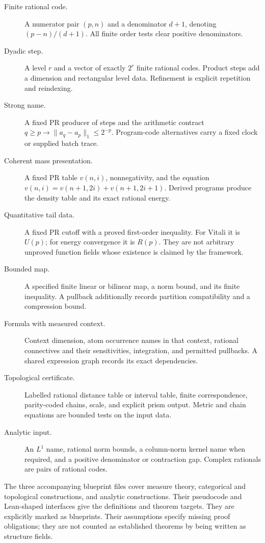 \begin{description}
\item[Finite rational code.] A numerator pair \((p,n)\) and a
denominator \(d+1\), denoting \((p-n)/(d+1)\). All finite order
tests clear positive denominators.
\item[Dyadic step.] A level \(r\) and a vector of exactly \(2^r\)
finite rational codes. Product steps add a dimension and rectangular
level data. Refinement is explicit repetition and reindexing.
\item[Strong name.] A fixed PR producer of steps and the arithmetic
contract \(q\geq p\to\|a_q-a_p\|_1\leq2^{-p}\).
Program-code alternatives carry a fixed clock or supplied batch trace.
\item[Coherent mass presentation.] A fixed PR table
\(v(n,i)\), nonnegativity, and the equation
\(v(n,i)=v(n+1,2i)+v(n+1,2i+1)\). Derived programs produce the
density table and its exact rational energy.
\item[Quantitative tail data.] A fixed PR cutoff with a proved
first-order inequality. For Vitali it is \(U(p)\); for energy
convergence it is \(R(p)\). They are not arbitrary unproved function
fields whose existence is claimed by the framework.
\item[Bounded map.] A specified finite linear or bilinear map, a
norm bound, and its finite inequality. A pullback additionally records
partition compatibility and a compression bound.
\item[Formula with measured context.] Context dimension, atom
occurrence names in that context, rational connectives and their
sensitivities, integration, and permitted pullbacks. A shared
expression graph records its exact dependencies.
\item[Topological certificate.] Labelled rational distance table or
interval table, finite correspondence, parity-coded chains, scale,
and explicit prism output. Metric and chain equations are bounded
tests on the input data.
\item[Analytic input.] An \(L^1\) name, rational norm bounds, a
column-norm kernel name when required, and a positive denominator or
contraction gap. Complex rationals are pairs of rational codes.
\end{description}

The three accompanying blueprint files cover measure theory,
categorical and topological constructions, and analytic constructions.
Their pseudocode and Lean-shaped interfaces give the definitions and
theorem targets.
They are explicitly marked as blueprints. Their assumptions specify
missing proof obligations; they are not counted as established
theorems by being written as structure fields.

